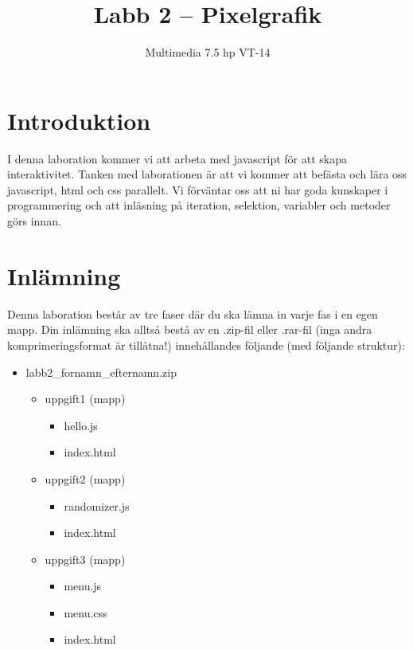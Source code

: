 \documentclass[12pt]{article}
\date{}
\title{ Labb 2 -- Pixelgrafik }
\author{ Multimedia 7.5 hp VT-14 }
\begin{document}
\maketitle
\vspace{-2em}



\section{Introduktion}
I denna laboration kommer vi att arbeta med javascript för att skapa interaktivitet. Tanken med laborationen är att vi kommer att befästa och lära oss javascript, html och css parallelt. Vi förväntar oss att ni har goda kunskaper i programmering och att inläsning på iteration, selektion, variabler och metoder görs innan. 

\section{Inlämning}
Denna laboration består av tre faser där du ska lämna in varje fas i en egen mapp. Din inlämning ska alltså bestå av en .zip-fil eller .rar-fil (inga andra komprimeringsformat är tillåtna!) innehållandes följande (med följande struktur):
  \begin{itemize}
    \item labb2\_fornamn\_efternamn.zip

      \begin{itemize}
        \item uppgift1 (mapp)
          \begin{itemize}
            \item hello.js 
            \item index.html
          \end{itemize}
        \item uppgift2 (mapp)
          \begin{itemize}
            \item randomizer.js
            \item index.html
          \end{itemize}
	      \item uppgift3 (mapp)
          \begin{itemize}
            \item menu.js
            \item menu.css
            \item index.html
          \end{itemize}
    \end{itemize}
  \end{itemize}
\end{document}
